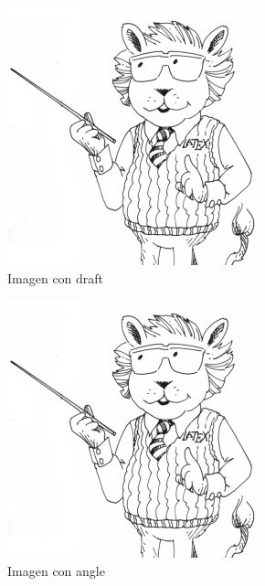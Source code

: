 \documentclass{article}
\begin{document}
\begin{figure}[H]
    \centering
    \includegraphics[draft]{images/latexlion2.png}
    \caption{Imagen con draft}
    \label{fig:my_label6}
\end{figure}
\begin{figure}[H]
    \centering
    \includegraphics[angle=90]{images/latexlion2.png}
    \caption{Imagen con angle}
    \label{fig:my_label7}
\end{figure}
\newpage
\end{document}
